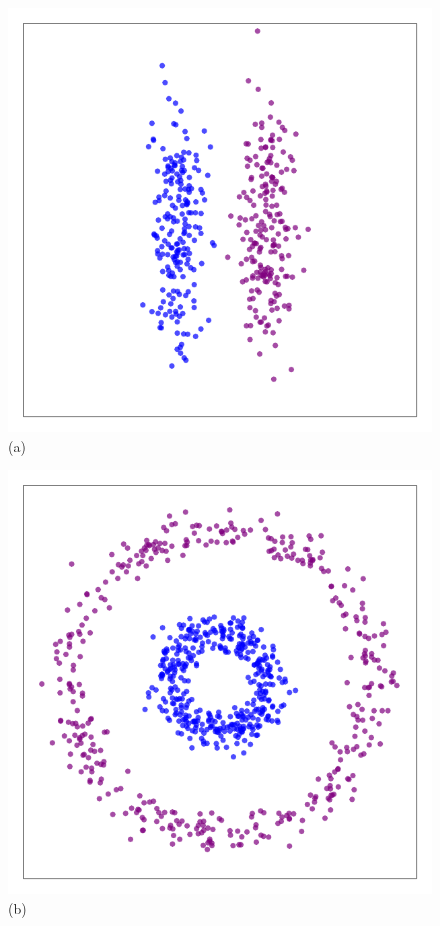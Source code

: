 \documentclass[aps,preprint,nofootinbib,floatfix]{revtex4-1}
\begin{document}
\begin{figure}
\begin{minipage}{0.25\textwidth}
\includegraphics[width=1\textwidth]{2cigars.pdf}\\[-1em] (a)
\end{minipage}
\begin{minipage}{0.25\textwidth}
\includegraphics[width=1\textwidth]{2circles.pdf}\\[-1em] (b)

\end{minipage}
\end{figure}
\end{document}
